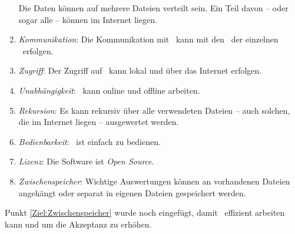 \begin{enumerate}
	Die Daten können auf mehrere Dateien verteilt sein.
	Ein Teil davon -- oder sogar alle -- können im Internet liegen.
	\item \label{Ziel:Kommunikation} \emph{Kommunikation}:
	Die Kommunikation mit \ASBA\ kann mit den \Fachbegriffen\ der einzelnen \Fachgebiete\ erfolgen.
	\item \label{Ziel:Zugriff} \emph{Zugriff}:
	Der Zugriff auf \ASBA\ kann lokal und über das Internet erfolgen.
	\item \label{Ziel:Unabhängigkeit} \emph{Unabhängigkeit}:
	\ASBA\ kann online und offline arbeiten.
	\item \label{Ziel:Rekursion} \emph{Rekursion}:
	Es kann rekursiv über alle verwendeten Dateien -- auch solchen, die im Internet liegen -- ausgewertet werden.
	\item \label{Ziel:Bedienbarkeit} \emph{Bedienbarkeit}:
	\ASBA\ ist einfach zu bedienen.
	\item \label{Ziel:Lizenz} \emph{Lizenz}:
	Die Software ist \emph{Open Source}.
	\item \label{Ziel:Zwischenspeicher} \emph{Zwischenspeicher}:
	Wichtige Auswertungen können an vorhandenen Dateien angehängt oder separat in eigenen Dateien gespeichert werden.
\end{enumerate}
%
Punkt \ref{Ziel:Zwischenspeicher} wurde noch eingefügt, damit \ASBA\ effizient arbeiten kann und um die Akzeptanz zu erhöhen.

